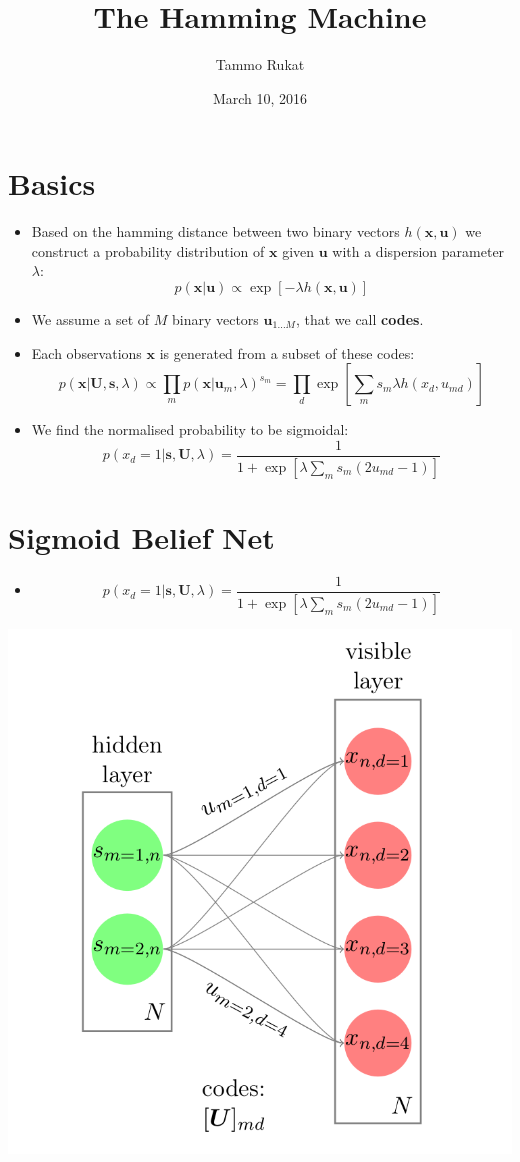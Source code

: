 \documentclass[11pt]{article}
\author{Tammo Rukat}
\date{March 10, 2016}
\title{The Hamming Machine}
\begin{document}
\maketitle
\setcounter{tocdepth}{1}
\tableofcontents


\section*{Basics}
\label{sec-1}
\begin{itemize}
\item Based on the hamming distance between two binary vectors ${h(\mathbf{x},\mathbf{u})}$ we construct a probability distribution of ${\mathbf{x}}$ given ${\mathbf{u}}$ with a dispersion parameter ${\lambda}$: $$ p(\mathbf{x}|\mathbf{u}) \propto \exp\left[ -\lambda h(\mathbf{x},\mathbf{u}) \right] $$
\item We assume a set of ${M}$ binary vectors ${\mathbf{u}_{1\ldots M}}$, that we call \textbf{codes}.
\item Each observations ${\mathbf{x} }$ is generated from a subset of these codes: $$ p(\mathbf{x}|\mathbf{U},\mathbf{s},\lambda) \propto \prod\limits_m p(\mathbf{x}|\mathbf{u}_m,\lambda)^{s_m} = \prod\limits_d \exp\left[ \sum_m s_m \lambda h(x_d,u_{md}) \right]$$
\item We find the normalised probability to be sigmoidal: $$ p(x_d = 1|\mathbf{s}, \mathbf{U}, \lambda) = \frac{1}{1+\exp\left[ \lambda \sum_m s_m (2u_{md} - 1) \right]} $$
\end{itemize}

\section*{Sigmoid Belief Net}
\label{sec-2}
\begin{itemize}
\item $$ p(x_d = 1|\mathbf{s}, \mathbf{U}, \lambda) =\frac{1}{1+\exp\left[ \lambda \sum_m s_m (2u_{md} - 1) \right]} $$
\end{itemize}


\includegraphics[width=.9\linewidth]{figures/hm0_1.png}
\end{document}
